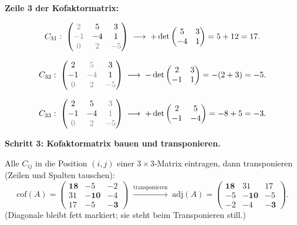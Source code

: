 \documentclass[a4paper,12pt]{article}
\begin{document}
\textbf{Zeile 3 der Kofaktormatrix:}

\[
C_{31}: \;
\begin{pmatrix}
\color{gray}2 & 5 & 3 \\
\color{gray}{-1} & -4 & 1 \\
\color{gray}0 & \color{gray}2 & \color{gray}{-5}
\end{pmatrix}
\;\longrightarrow\;
+\det \begin{pmatrix} 5 & 3 \\ -4 & 1 \end{pmatrix} = 5 + 12 = 17.
\]

\[
C_{32}: \;
\begin{pmatrix}
2 & \color{gray}5 & 3 \\
-1 & \color{gray}{-4} & 1 \\
\color{gray}0 & \color{gray}2 & \color{gray}{-5}
\end{pmatrix}
\;\longrightarrow\;
-\det \begin{pmatrix} 2 & 3 \\ -1 & 1 \end{pmatrix} = -(2 + 3) = -5.
\]

\[
C_{33}: \;
\begin{pmatrix}
2 & 5 & \color{gray}3 \\
-1 & -4 & \color{gray}1 \\
\color{gray}0 & \color{gray}2 & \color{gray}{-5}
\end{pmatrix}
\;\longrightarrow\;
+\det \begin{pmatrix} 2 & 5 \\ -1 & -4 \end{pmatrix} = -8 + 5 = -3.
\]

\textbf{Schritt 3: Kofaktormatrix bauen und transponieren.}

Alle $C_{ij}$ in die Position $(i, j)$ einer $3 \times 3$-Matrix eintragen, dann transponieren (Zeilen und Spalten tauschen):
\[
\text{cof}(A) = \begin{pmatrix} \mathbf{18} & -5 & -2 \\ 31 & \mathbf{-10} & -4 \\ 17 & -5 & \mathbf{-3} \end{pmatrix}
\;\xrightarrow{\text{transponieren}}\;
\text{adj}(A) = \begin{pmatrix} \mathbf{18} & 31 & 17 \\ -5 & \mathbf{-10} & -5 \\ -2 & -4 & \mathbf{-3} \end{pmatrix}.
\]
(Diagonale bleibt fett markiert; sie steht beim Transponieren still.)
\end{document}
